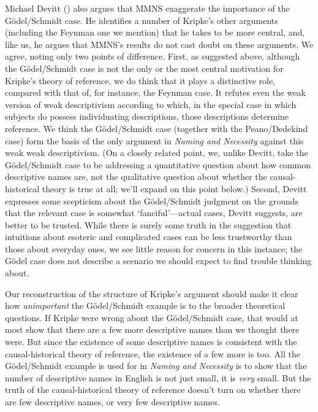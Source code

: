 \documentclass[
  10pt,
  letterpaper,
  DIV=11,
  numbers=noendperiod,
  twoside]{scrartcl}
\begin{document}
Michael Devitt () also argues that MMNS
exaggerate the importance of the Gödel/Schmidt case. He identifies a
number of Kripke's other arguments (including the Feynman one we
mention) that he takes to be more central, and, like us, he argues that
MMNS's results do not cast doubt on these arguments. We agree, noting
only two points of difference. First, as suggested above, although the
Gödel/Schmidt case is not the only or the most central motivation for
Kripke's theory of reference, we do think that it plays a distinctive
role, compared with that of, for instance, the Feynman case. It refutes
even the weak version of weak descriptivism according to which, in the
special case in which subjects do possess individuating descriptions,
those descriptions determine reference. We think the Gödel/Schmidt case
(together with the Peano/Dedekind case) form the basis of the only
argument in \emph{Naming and Necessity} against this weak weak
descriptivism. (On a closely related point, we, unlike Devitt, take the
Gödel/Schmidt case to be addressing a quantitative question about how
common descriptive names are, not the qualitative question about whether
the causal-historical theory is true at all; we'll expand on this point
below.) Second, Devitt expresses some scepticism about the Gödel/Schmidt
judgment on the grounds that the relevant case is somewhat
`fanciful'---actual cases, Devitt suggests, are better to be trusted.
While there is surely some truth in the suggestion that intuitions about
esoteric and complicated cases can be less trustworthy than those about
everyday ones, we see little reason for concern in this instance; the
Gödel case does not describe a scenario we should expect to find trouble
thinking about.

Our reconstruction of the structure of Kripke's argument should make it
clear how \emph{unimportant} the Gödel/Schmidt example is to the broader
theoretical questions. If Kripke were wrong about the Gödel/Schmidt
case, that would at most show that there are a few more descriptive
names than we thought there were. But since the existence of some
descriptive names is consistent with the causal-historical theory of
reference, the existence of a few more is too. All the Gödel/Schmidt
example is used for in \emph{Naming and Necessity} is to show that the
number of descriptive names in English is not just small, it is
\emph{very} small. But the truth of the causal-historical theory of
reference doesn't turn on whether there are few descriptive names, or
very few descriptive names.
\end{document}
